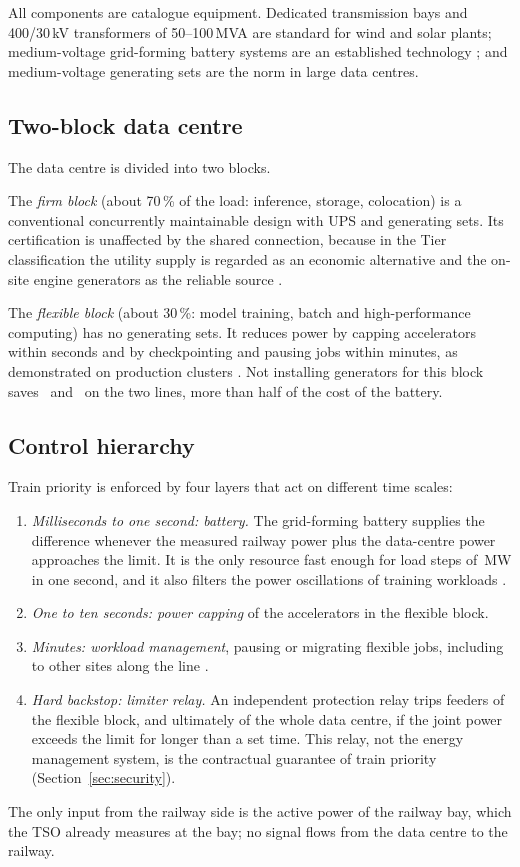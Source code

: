 All components are catalogue equipment. Dedicated transmission bays and 400/30\,kV transformers of 50--100\,MVA are standard for wind and solar plants; medium-voltage grid-forming battery systems are an established technology \cite{lin2020}; and medium-voltage generating sets are the norm in large data centres.

\subsection{Two-block data centre}

The data centre is divided into two blocks.

The \emph{firm block} (about 70\,\% of the load: inference, storage, colocation) is a conventional concurrently maintainable design with UPS and generating sets. Its certification is unaffected by the shared connection, because in the Tier classification the utility supply is regarded as an economic alternative and the on-site engine generators as the reliable source \cite{uptime2018}.

The \emph{flexible block} (about 30\,\%: model training, batch and high-performance computing) has no generating sets. It reduces power by capping accelerators within seconds and by checkpointing and pausing jobs within minutes, as demonstrated on production clusters \cite{colangelo2025}. Not installing generators for this block saves \mzbGenSaved\,\MEUR{} and \msGenSaved\,\MEUR{} on the two lines, more than half of the cost of the battery.

\subsection{Control hierarchy}

Train priority is enforced by four layers that act on different time scales:
\begin{enumerate}
\item \emph{Milliseconds to one second: battery.} The grid-forming battery supplies the difference whenever the measured railway power plus the data-centre power approaches the limit. It is the only resource fast enough for load steps of \mzbRampS\,MW in one second, and it also filters the power oscillations of training workloads \cite{li2024}.
\item \emph{One to ten seconds: power capping} of the accelerators in the flexible block.
\item \emph{Minutes: workload management}, pausing or migrating flexible jobs, including to other sites along the line \cite{zheng2020}.
\item \emph{Hard backstop: limiter relay.} An independent protection relay trips feeders of the flexible block, and ultimately of the whole data centre, if the joint power exceeds the limit for longer than a set time. This relay, not the energy management system, is the contractual guarantee of train priority (Section~\ref{sec:security}).
\end{enumerate}
The only input from the railway side is the active power of the railway bay, which the TSO already measures at the bay; no signal flows from the data centre to the railway.

